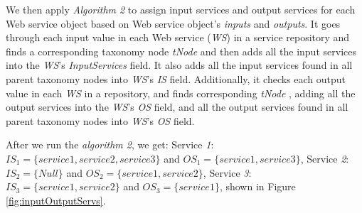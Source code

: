 We then apply \emph{Algorithm 2} to assign input services and output services for each Web service object based on Web service object's \emph{inputs} and \emph{outputs}. It goes through each input value in each Web service (\emph{WS}) in a service repository and finds a corresponding taxonomy node \emph{tNode} and then adds all the input services into the \emph{WS}'s \emph{InputServices} field. It also adds all the input services found in all parent taxonomy nodes into \emph{WS}'s \emph{IS} field. Additionally, it checks each output value in each \emph{WS} in a repository, and finds corresponding \emph{tNode} , adding all the output services into the \emph{WS}'s \emph{OS} field, and all the output services found in all parent taxonomy nodes into \emph{WS}'s \emph{OS} field.
\begin{exmp}
\noindent
After we run the \emph{algorithm 2}, we get: 
Service \emph{1}: $IS_1 = \{service 1, service 2, service 3\}$ and
 $OS_1 = \{service 1, service 3\}$,
Service \emph{2}: $IS_2 = \{Null\}$ and
$OS_2 = \{service 1, service 2\}$,
Service \emph{3}: $IS_3 = \{service 1, service 2\}$ and
 $OS_3 = \{service 1\}$, shown in Figure \ref{fig:inputOutputServs}.
\end{exmp}

